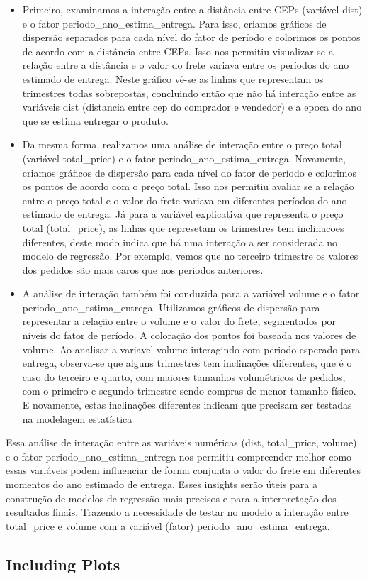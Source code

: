 \documentclass[
]{article}
\begin{document}
\begin{itemize}
\item
  Primeiro, examinamos a interação entre a distância entre CEPs
  (variável dist) e o fator periodo\_ano\_estima\_entrega. Para isso,
  criamos gráficos de dispersão separados para cada nível do fator de
  período e colorimos os pontos de acordo com a distância entre CEPs.
  Isso nos permitiu visualizar se a relação entre a distância e o valor
  do frete variava entre os períodos do ano estimado de entrega. Neste
  gráfico vê-se as linhas que representam os trimestres todas
  sobrepostas, concluindo então que não há interação entre as variáveis
  dist (distancia entre cep do comprador e vendedor) e a epoca do ano
  que se estima entregar o produto.
\item
  Da mesma forma, realizamos uma análise de interação entre o preço
  total (variável total\_price) e o fator periodo\_ano\_estima\_entrega.
  Novamente, criamos gráficos de dispersão para cada nível do fator de
  período e colorimos os pontos de acordo com o preço total. Isso nos
  permitiu avaliar se a relação entre o preço total e o valor do frete
  variava em diferentes períodos do ano estimado de entrega. Já para a
  variável explicativa que representa o preço total (total\_price), as
  linhas que represetam os trimestres tem inclinacoes diferentes, deste
  modo indica que há uma interação a ser considerada no modelo de
  regressão. Por exemplo, vemos que no terceiro trimestre os valores dos
  pedidos são mais caros que nos periodos anteriores.
\item
  A análise de interação também foi conduzida para a variável volume e o
  fator periodo\_ano\_estima\_entrega. Utilizamos gráficos de dispersão
  para representar a relação entre o volume e o valor do frete,
  segmentados por níveis do fator de período. A coloração dos pontos foi
  baseada nos valores de volume. Ao analisar a variavel volume
  interagindo com periodo esperado para entrega, observa-se que alguns
  trimestres tem inclinações diferentes, que é o caso do terceiro e
  quarto, com maiores tamanhos volumétricos de pedidos, com o primeiro e
  segundo trimestre sendo compras de menor tamanho físico. E novamente,
  estas inclinações diferentes indicam que precisam ser testadas na
  modelagem estatística
\end{itemize}

Essa análise de interação entre as variáveis numéricas (dist,
total\_price, volume) e o fator periodo\_ano\_estima\_entrega nos
permitiu compreender melhor como essas variáveis podem influenciar de
forma conjunta o valor do frete em diferentes momentos do ano estimado
de entrega. Esses insights serão úteis para a construção de modelos de
regressão mais precisos e para a interpretação dos resultados finais.
Trazendo a necessidade de testar no modelo a interação entre
total\_price e volume com a variável (fator)
periodo\_ano\_estima\_entrega.

\hypertarget{including-plots}{%
\subsection{Including Plots}\label{including-plots}}
\end{document}
